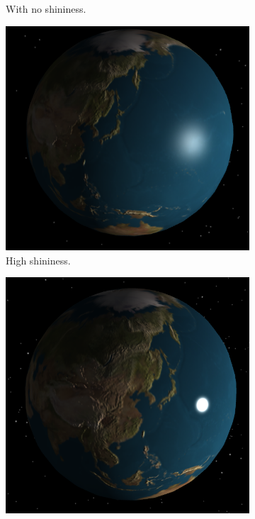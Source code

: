 \documentclass[12pt]{article}
\begin{document}
\begin{figure}[H]
\begin{subfigure}[b]{0.4\textwidth}
                \caption{With no shininess.}
                \label{fig:Specular 2.}
	 \end{subfigure}
	         \begin{subfigure}[b]{0.4\textwidth}
                \includegraphics[width=\textwidth]{images/specular3}
                \caption{High shininess.}
                \label{fig:Specular 3.}
	 \end{subfigure}
	         \begin{subfigure}[b]{0.4\textwidth}
                \includegraphics[width=\textwidth]{images/specular4}

\end{subfigure}
\end{figure}
\end{document}
